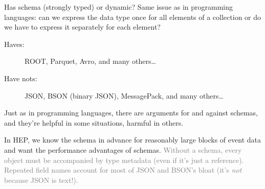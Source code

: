 \documentclass[aspectratio=169]{beamer}
\begin{document}
\begin{frame}{Has schema (strongly typed) or dynamic?}
\vspace{0.5 cm}
Same issue as in programming languages: can we express the data type once for all elements of a collection or do we have to express it separately for each element?

\vfill

\begin{description}
\item[Haves:] ROOT, Parquet, Avro, and many others\ldots
\item[Have nots:] JSON, BSON (binary JSON), MessagePack, and many others\ldots
\end{description}

\vfill

Just as in programming languages, there are arguments for and against schemas, and they're helpful in some situations, harmful in others.

\vfill

In HEP, we know the schema in advance for reasonably large blocks of event data and want the performance advantages of schemas. \textcolor{gray}{Without a schema, every object must be accompanied by type metadata (even if it's just a reference). Repeated field names account for most of JSON and BSON's bloat (it's {\it not} because JSON is text!).}
\end{frame}
\end{document}
